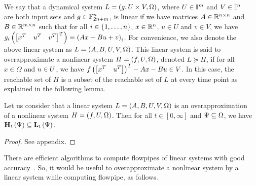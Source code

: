 %
%
We say that a dynamical system
$L = \left(g,U\times V,\Omega\right)$, where $U\in\mathbb{I}^m$ and
$V\in\mathbb{I}^n$ are both input sets and $g\in\mathbb{F}_{2n+m}^n$, is
linear if we have matrices $A\in\mathbb{R}^{n\times n}$ and
$B\in\mathbb{R}^{m\times n}$ such that for all $i\in\left\{1,\ldots,n\right\}$,
$x\in\mathbb{R}^n$, $u\in U$ and $v\in V$, we have $ g_i\left(\begin{bmatrix}x^T
& u^T & v^T\end{bmatrix}^T\right) = \left(Ax + Bu + v\right)_i$.  For convenience, we also
denote the above linear system as $L = \left(A,B,U,V,\Omega\right)$.  This
linear system is said to overapproximate a nonlinear system $H
= \left(f,{U},\Omega\right)$, denoted $L\succeq H$, if for all
$x\in\Omega$ and $u\in{U}$, we have $f\left(\begin{bmatrix}x^T & u^T\end{bmatrix}\right)^T
- Ax - Bu \in V$.  In this case, the reachable set of $H$ is a subset
of the reachable set of $L$ at every time point as explained in the
following lemma.
%
\begin{lemma}\label{lem:inclin}
Let us consider that a linear system $L = \left(A,B,U,V,\Omega\right)$ is an
overapproximation of a nonlinear system $H = \left(f,U,\Omega\right)$.  Then
for all $t\in[0,\infty]$ and $\Psi\subseteq\Omega$, we have
$\mathbf{H}_{t}\left(\Psi\right)\subseteq \mathbf{L}_{t}\left(\Psi\right)$.
\end{lemma}
%
\begin{proof}
See appendix.
\end{proof}
%
There are efficient algorithms to compute flowpipes of linear systems
with good accuracy~\cite{girard2005reachability,girard2008efficient}.
So, it would be useful to overapproximate a nonlinear system by a
linear system while computing flowpipe, as follows.
%
